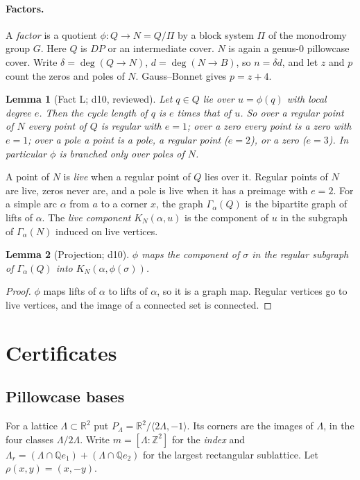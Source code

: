 \documentclass[11pt]{article}
\newtheorem{lemma}{Lemma}
\theoremstyle{definition}
\theoremstyle{remark}
\newcommand{\Q}{\mathbb Q}
\newcommand{\Z}{\mathbb Z}
\newcommand{\R}{\mathbb R}
\begin{document}
\paragraph{Factors.}
A \emph{factor} is a quotient $\phi\colon Q\to N=Q/\Pi$ by a block system $\Pi$
of the monodromy group $G$. Here $Q$ is $DP$ or an intermediate cover. $N$ is
again a genus-$0$ pillowcase cover. Write $\delta=\deg(Q\to N)$,
$d=\deg(N\to B)$, so $n=\delta d$, and let $z$ and $p$ count the zeros and
poles of $N$. Gauss--Bonnet gives $p=z+4$.

\begin{lemma}[Fact L; d10, reviewed]\label{lem:factL}
Let $q\in Q$ lie over $u=\phi(q)$ with local degree $e$. Then the cycle length
of $q$ is $e$ times that of $u$. So over a regular point of $N$ every point of
$Q$ is regular with $e=1$; over a zero every point is a zero with $e=1$; over a
pole a point is a pole, a regular point ($e=2$), or a zero ($e=3$). In
particular $\phi$ is branched only over poles of $N$.
\end{lemma}

A point of $N$ is \emph{live} when a regular point of $Q$ lies over it.
Regular points of $N$ are live, zeros never are, and a pole is live when it has
a preimage with $e=2$. For a simple arc $\alpha$ from $a$ to a corner $x$, the
graph $\Gamma_\alpha(Q)$ is the bipartite graph of lifts of $\alpha$. The
\emph{live component} $K_N(\alpha,u)$ is the component of $u$ in the subgraph of
$\Gamma_\alpha(N)$ induced on live vertices.

\begin{lemma}[Projection; d10]\label{lem:proj}
$\phi$ maps the component of $\sigma$ in the regular subgraph of
$\Gamma_\alpha(Q)$ into $K_N(\alpha,\phi(\sigma))$.
\end{lemma}
\begin{proof}
$\phi$ maps lifts of $\alpha$ to lifts of $\alpha$, so it is a graph map.
Regular vertices go to live vertices, and the image of a connected set is
connected.
\end{proof}

\section{Certificates}\label{sec:certificates}

\subsection{Pillowcase bases}\label{sec:bases}
For a lattice $\Lambda\subset\R^2$ put
$P_\Lambda=\R^2/\langle 2\Lambda,-1\rangle$. Its corners are the images of
$\Lambda$, in the four classes $\Lambda/2\Lambda$. Write
$m=[\Lambda:\Z^2]$ for the \emph{index} and
$\Lambda_r=(\Lambda\cap\Q e_1)+(\Lambda\cap\Q e_2)$ for the largest
rectangular sublattice. Let $\rho(x,y)=(x,-y)$.
\end{document}
